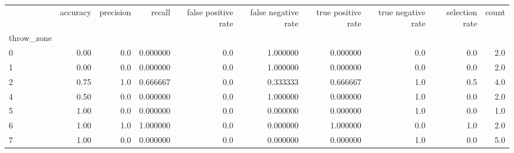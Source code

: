 \begin{tabular}{lrrrrrrrrr}
\toprule
{} &  accuracy &  precision &    recall &  false positive rate &  false negative rate &  true positive rate &  true negative rate &  selection rate &  count \\
throw\_zone &           &            &           &                      &                      &                     &                     &                 &        \\
\midrule
0          &      0.00 &        0.0 &  0.000000 &                  0.0 &             1.000000 &            0.000000 &                 0.0 &             0.0 &    2.0 \\
1          &      0.00 &        0.0 &  0.000000 &                  0.0 &             1.000000 &            0.000000 &                 0.0 &             0.0 &    2.0 \\
2          &      0.75 &        1.0 &  0.666667 &                  0.0 &             0.333333 &            0.666667 &                 1.0 &             0.5 &    4.0 \\
4          &      0.50 &        0.0 &  0.000000 &                  0.0 &             1.000000 &            0.000000 &                 1.0 &             0.0 &    2.0 \\
5          &      1.00 &        0.0 &  0.000000 &                  0.0 &             0.000000 &            0.000000 &                 1.0 &             0.0 &    1.0 \\
6          &      1.00 &        1.0 &  1.000000 &                  0.0 &             0.000000 &            1.000000 &                 0.0 &             1.0 &    2.0 \\
7          &      1.00 &        0.0 &  0.000000 &                  0.0 &             0.000000 &            0.000000 &                 1.0 &             0.0 &    5.0 \\
\bottomrule
\end{tabular}
